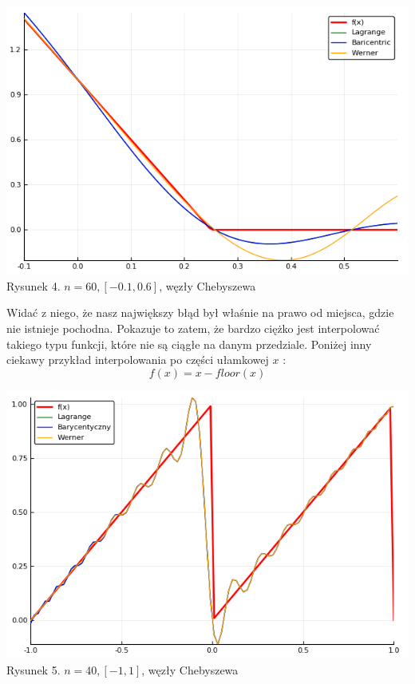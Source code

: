 \documentclass[11pt, wide]{article}
\begin{document}
\begin{center}
    \includegraphics[scale=0.4]{wykres4}\\
    Rysunek 4. $n = 60, [-0.1,0.6]$, węzły Chebyszewa
\end{center}
Widać z niego, że nasz największy błąd był właśnie na prawo od miejsca, gdzie nie istnieje pochodna. 
Pokazuje to zatem, że bardzo ciężko jest interpolować takiego typu funkcji, które nie są ciągłe na danym przedziale.
Poniżej inny ciekawy przykład interpolowania po części ułamkowej $x$ : 
$$
    f(x) = x - floor(x)
$$
\begin{center}
    \includegraphics[scale=0.4]{wykres5}\\
    Rysunek 5. $n = 40, [-1,1]$, węzły Chebyszewa
\end{center}
\end{document}
